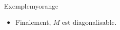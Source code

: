 \begin{omed}{Exemple}{myorange}
\begin{itemize}
            Si $\lambda = 2$, 
            \begin{align*}
                \rg(2 I_5 - M) 
                &= \rg \begin{bmatrix}
                    & -5 & & & \\
                    &  & & & \\
                    & & -2 & -2 & \\
                    & & -3 & -3 & \\
                    & & & & 
                \end{bmatrix} \\
                &= \rg \begin{bmatrix}
                    & 1 & & & \\
                    &  & & & \\
                    & & 1 &  & \\
                    & & 1 & & \\
                    & & & & 
                \end{bmatrix} \\
                &= 2 = 5 - 3
            \end{align*}
            \item Finalement, $M$ est diagonalisable.
        \end{itemize}
    \end{omed}


